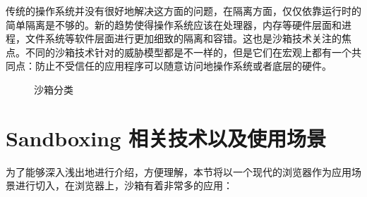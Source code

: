 \documentclass[final,5p,times]{elsarticle}
\begin{document}
传统的操作系统并没有很好地解决这方面的问题，在隔离方面，仅仅依靠运行时的简单隔离是不够的。新的趋势使得操作系统应该在处理器，内存等硬件层面和进程，文件系统等软件层面进行更加细致的隔离和容错。这也是沙箱技术关注的焦点。不同的沙箱技术针对的威胁模型都是不一样的，但是它们在宏观上都有一个共同点：防止不受信任的应用程序可以随意访问地操作系统或者底层的硬件。

\begin{figure}
\centering
{}
\caption{沙箱分类}
\end{figure}

\section{Sandboxing 相关技术以及使用场景}
\label{s:implementation}

为了能够深入浅出地进行介绍，方便理解，本节将以一个现代的浏览器作为应用场景进行切入，在浏览器上，沙箱有着非常多的应用：
\end{document}
